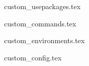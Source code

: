 {custom_usepackages.tex}


{custom_commands.tex}


{custom_environments.tex}


{custom_config.tex}


\newcommand{\thesisauthors}[1][ \& ]%
    {%
    \ifthenelse{\equal{\thesisauthora}{}}{\message{No thesis authors defined}}%
        {%
        \ifthenelse{\equal{\thesisauthorb}{}}{\thesisauthora{}}%
            {%
            \ifthenelse{\equal{\thesisauthorc}{}}{\thesisauthora{}#1\thesisauthorb{}}{\thesisauthora{}#1\thesisauthorb{}#1\thesisauthorc{}}%
            }%
        }%
    }%


